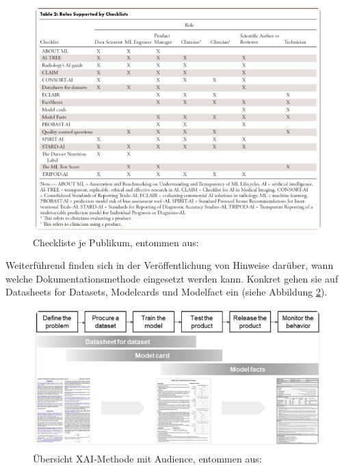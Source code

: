 \begin{figure}[h]
    \centering
    \includegraphics[scale=0.45]{pic/MA-Bilder/Literaturrecherche/49-ChecklistNachRollen.PNG}
    \caption{Checkliste je Publikum, entommen aus: \cite{garbin2022assessing}}
    \label{Fig:ChecklisteJeRolle}
\end{figure}

Weiterführend finden sich in der Veröffentlichung von \cite{garbin2022assessing} Hinweise darüber, wann welche Dokumentationsmethode eingesetzt werden kann. Konkret gehen sie auf Datasheets for Datasets, Modelcards und Modelfact ein (siehe Abbildung \ref{Fig:Datsheet_Datest_Modelfact}).
\begin{figure}
    \centering
    \includegraphics[scale=0.45]{pic/MA-Bilder/Literaturrecherche/49-ZusammenspielDatasheets_Modelcard_Modelfacts.PNG}
    \caption{Übersicht XAI-Methode mit Audience, entommen aus: \cite{garbin2022assessing}}
    \label{Fig:Datsheet_Datest_Modelfact}
\end{figure}
